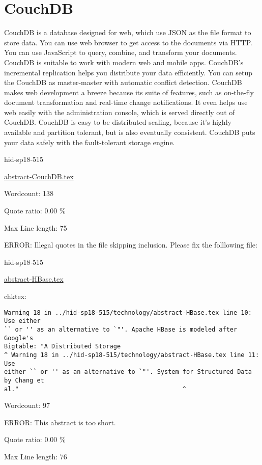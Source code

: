 \section{CouchDB}

CouchDB\cite{hid-sp18-515-www-couchdb} is a database designed for web, 
which use JSON as the file format to store data. You can use web 
browser to get access to the documents via HTTP. You can use JavaScript 
to query, combine, and transform your documents. CouchDB is suitable 
to work with modern web and mobile apps. CouchDB’s incremental replication 
helps you distribute your data efficiently. You can setup the CouchDB 
as master-master with automatic conflict detection. CouchDB makes 
web development a breeze because its suite of features, such as 
on-the-fly document transformation and real-time change notifications. 
It even helps use web easily with the administration console, which 
is served directly out of CouchDB. CouchDB is easy to be distributed 
scaling, because it's highly available and partition tolerant, but 
is also eventually consistent. CouchDB puts your data safely with 
the fault-tolerant storage engine.



\begin{IU}

hid-sp18-515

\href{https://github.com/cloudmesh-community/hid-sp18-515/blob/master//technology/abstract-CouchDB.tex}{abstract-CouchDB.tex}

 

Wordcount: 138


Quote ratio: 0.00 \%
 
Max Line length: 75
\end{IU}

ERROR: Illegal quotes in the file skipping inclusion. Please fix the folllowing file:

\begin{IU}

hid-sp18-515

\href{https://github.com/cloudmesh-community/hid-sp18-515/blob/master//technology/abstract-HBase.tex}{abstract-HBase.tex}

 
chktex:
\begin{tiny}
\begin{verbatim}
Warning 18 in ../hid-sp18-515/technology/abstract-HBase.tex line 10: Use either
`` or '' as an alternative to `"'. Apache HBase is modeled after Google's
Bigtable: "A Distributed Storage
^ Warning 18 in ../hid-sp18-515/technology/abstract-HBase.tex line 11: Use
either `` or '' as an alternative to `"'. System for Structured Data by Chang et
al."                                             ^
\end{verbatim}
\end{tiny}

Wordcount: 97

ERROR: This abstract is too short.


Quote ratio: 0.00 \%
 
Max Line length: 76
\end{IU}

